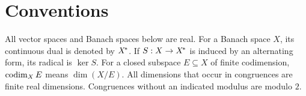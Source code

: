 \section{Conventions}
All vector spaces and Banach spaces below are real.  For a Banach space $X$, its continuous dual is
denoted by ${X}^{\!*}$.  If $S:X\to{X}^{\!*}$ is induced by an alternating form, its
radical is $\ker S$.  For a closed subspace $E\subseteq X$ of finite codimension,
$\operatorname{codim}_X E$ means $\dim(X/E)$.  All dimensions that occur in congruences are finite real
dimensions.  Congruences without an indicated modulus are modulo $2$.